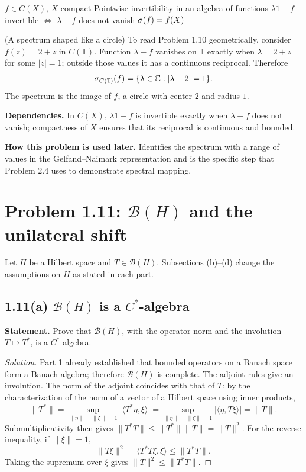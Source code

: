 \proofdiagram
{$f\in C(X)$, $X$ compact}
{Pointwise invertibility in an algebra of functions}
{$\lambda1-f$ invertible $\Longleftrightarrow$ $\lambda-f$ does not vanish}
{$\sigma(f)=f(X)$}

\begin{cthejemplo}{(A spectrum shaped like a circle)}
To read Problem 1.10 geometrically, consider $f(z)=2+z$ in $C(\mathbb T)$.
Function $\lambda-f$ vanishes on $\mathbb T$ exactly when
$\lambda=2+z$ for some $|z|=1$; outside those values it has a continuous reciprocal.
Therefore
\[
 \sigma_{C(\mathbb T)}(f)=\{\lambda\in\mathbb C:|\lambda-2|=1\}.
\]
The spectrum is the image of $f$, a circle with center $2$ and radius $1$.
\end{cthejemplo}

\noindent\textbf{Dependencies.} In $C(X)$, $\lambda1-f$ is invertible exactly when $\lambda-f$ does not vanish; compactness of $X$ ensures that its reciprocal is continuous and bounded.

\noindent\textbf{How this problem is used later.} Identifies the spectrum with a range of values in the Gelfand--Naimark representation and is the specific step that Problem 2.4 uses to demonstrate spectral mapping.

\pagebreak
\section{Problem 1.11: \texorpdfstring{$\mathcal B(H)$}{B(H)} and the unilateral shift}

Let $H$ be a Hilbert space and $T\in\mathcal B(H)$. Subsections (b)--(d) change the assumptions
on $H$ as stated in each part.

\subsection*{1.11(a) $\mathcal B(H)$ is a $C^*$-algebra}

\noindent\textbf{Statement.} Prove that $\mathcal B(H)$, with the operator norm and the involution $T\mapsto T^*$, is a $C^*$-algebra.

\begin{proof}[Solution]
Part 1 already established that bounded operators on a Banach space form a
Banach algebra; therefore $\mathcal B(H)$ is complete. The adjoint rules give an involution.
The norm of the adjoint coincides with that of $T$: by the characterization of the norm of a vector of
a Hilbert space using inner products,
\[
 \|T^*\|=\sup_{\|\eta\|=\|\xi\|=1}|\langle T^*\eta,\xi\rangle|
 =\sup_{\|\eta\|=\|\xi\|=1}|\langle\eta,T\xi\rangle|=\|T\|.
\]
Submultiplicativity then gives $\|T^*T\|\le\|T^*\|\|T\|=\|T\|^2$.
For the reverse inequality, if $\|\xi\|=1$,
\[
\|T\xi\|^2=\langle T^*T\xi,\xi\rangle\le\|T^*T\|.
\]
Taking the supremum over $\xi$ gives $\|T\|^2\le\|T^*T\|$.
\end{proof}

